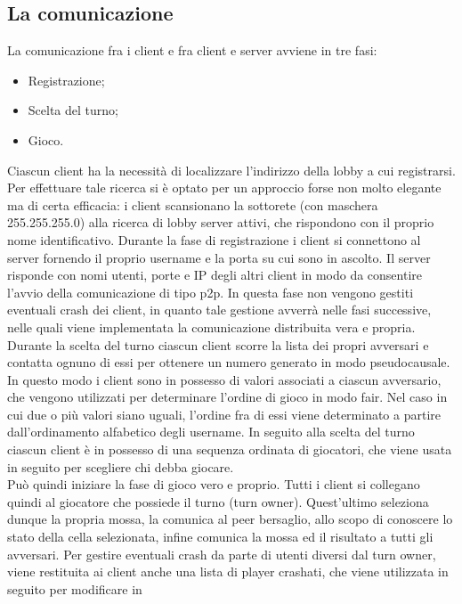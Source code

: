\subsection{La comunicazione}
La comunicazione fra i client e fra client e server avviene in tre fasi:
\begin{itemize}
 \item Registrazione;
 \item Scelta del turno;
\item Gioco.
\end{itemize}
Ciascun client ha la necessità di localizzare l'indirizzo della lobby a cui 
registrarsi. Per effettuare tale ricerca si è optato per un approccio forse non 
molto elegante ma di certa efficacia: i client scansionano la sottorete (con 
maschera 255.255.255.0) alla ricerca di lobby server attivi, che rispondono con 
il proprio nome identificativo.
Durante la fase di registrazione i client si connettono al 
server fornendo il proprio username e la porta su cui sono in ascolto. Il 
server risponde con nomi utenti, porte e IP degli altri client in modo da 
consentire l'avvio della comunicazione di tipo p2p. In questa fase non vengono 
gestiti eventuali crash dei client, in quanto tale gestione avverrà nelle fasi 
successive, nelle quali viene implementata la comunicazione distribuita vera e 
propria.
\\
Durante la scelta del turno ciascun client scorre la lista dei propri 
avversari e contatta ognuno di essi per ottenere un numero generato in modo 
pseudocausale. In questo modo i client sono in possesso di valori associati a 
ciascun avversario, che vengono utilizzati per determinare l'ordine di gioco in 
modo fair. Nel caso in cui due o più valori siano uguali, l'ordine fra di essi 
viene determinato a partire dall'ordinamento alfabetico degli username. In 
seguito alla scelta del turno ciascun client è in possesso di una sequenza 
ordinata di giocatori, che viene usata in seguito per scegliere chi debba 
giocare.
\\
Può quindi iniziare la fase di gioco vero e proprio. Tutti i client si 
collegano quindi al giocatore che possiede il turno (turn owner). %
Quest'ultimo seleziona dunque la propria mossa, la comunica al peer bersaglio, 
allo scopo di conoscere lo stato della cella selezionata, infine comunica la 
mossa ed il risultato a tutti gli avversari. Per gestire eventuali crash 
da parte di utenti diversi dal turn owner, viene restituita ai client anche una 
lista di player crashati, che viene utilizzata in seguito per modificare in 
